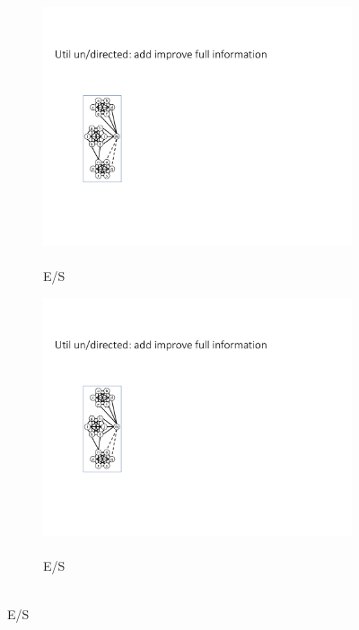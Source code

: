 \documentclass{article}
\begin{document}
\begin{figure}[t]
\begin{subfigure}{0.1\textwidth}
            \label{fig:Util_remove_UB}
        \end{subfigure}
        \hfill
        \begin{subfigure}{0.1\textwidth}
        \centering
            \includegraphics[page=19,width=\textwidth]{Graphs/graphs.pdf}
            \caption{\\E/S}
            \label{fig:Egal_directed_remove}
        \end{subfigure}
        \hfill
        \begin{subfigure}{0.1\textwidth}
            \centering
            \includegraphics[page=17,width=\textwidth]{Graphs/graphs.pdf}
            \caption{\\E/S}

\end{subfigure}
\end{figure}
\end{document}
